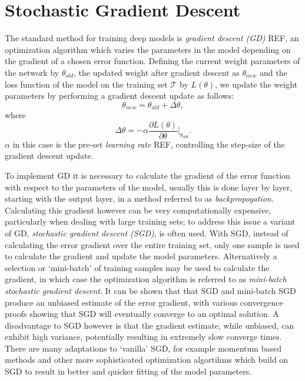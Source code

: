\section{Stochastic Gradient Descent}
The standard method for training deep models is \textit{gradient descent (GD)} \cite{Witten2011} \cite{Theodoridis2009} REF, an optimization algorithm which varies the parameters in the model depending on the gradient of a chosen error function. Defining the current weight parameters of the network by $\theta_{old}$, the updated weight after gradient descent as $\theta_{new}$ and the loss function of the model on the training set $\mathcal{T}$ by $L(\theta)$, we update the weight parameters by performing a gradient descent update as follows:
\begin{equation}
\theta_{new} = \theta_{old} + \Delta \theta,
\end{equation}
where
\begin{equation}
\Delta \theta = -\alpha \frac{\partial L(\theta)}{\partial\theta} |_{\theta_{old}}.
\end{equation}
$\alpha$ in this case is the pre-set \textit{learning rate} \cite{Witten2011} REF, controlling the step-size of the gradient descent update. 

 To implement GD it is necessary to calculate the gradient of the error function with respect to the parameters of the model, usually this is done layer by layer, starting with the output layer, in a method referred to as \textit{backpropogation}. Calculating this gradient however can be very computationally expensive, particularly when dealing with large training sets; to address this issue a variant of GD, \textit{stochastic gradient descent (SGD)}, is often used. With SGD, instead of calculating the error gradient over the entire training set, only one sample is used to calculate the gradient and update the model parameters. Alternatively a selection or `mini-batch' of training samples may be used to calculate the gradient, in which case the optimization algorithm is referred to as \textit{mini-batch stochastic gradient descent}. It can be shown that that SGD and mini-batch SGD produce an unbiased estimate of the error gradient, with various convergence proofs showing that SGD will eventually converge to an optimal solution. A disadvantage to SGD however is that the gradient estimate, while unbiased, can exhibit high variance, potentially resulting in extremely slow converge times. There are many adaptations to `vanilla' SGD, for example momentum based methods and other more sophisticated optimization algortihms which build on SGD to result in better and quicker fitting of the model parameters.









